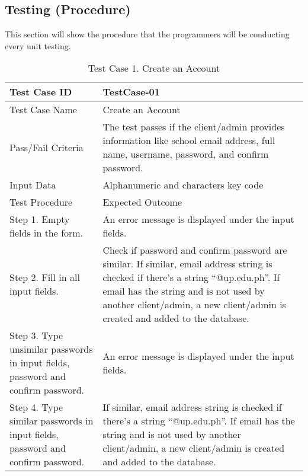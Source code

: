 \newpage
\subsection{Testing (Procedure)}
This section will show the procedure that the programmers will be conducting every unit testing. 

\begin{table}[h!]   %
\centering
\caption{Test Case 1. Create an Account} \vspace{0.25em}
\begin{tabular}{|p{2in}|p{4in}|} \hline
\centering 
Test Case ID & TestCase-01 \\ \hline
Test Case Name       &   Create an Account   \\ \hline
Pass/Fail Criteria       &   The test passes if the client/admin provides information like school email address, full name, username, password, and confirm password.    \\ \hline
Input Data  &  Alphanumeric and characters key code  \\ \hline
Test Procedure   & Expected Outcome  \\ \hline
Step 1. Empty fields in the form.        &    An error message is displayed under the input fields.    \\ \hline
Step 2. Fill in all input fields.   & Check if password and confirm password are similar. If similar, email address string is checked if there’s a string “@up.edu.ph”. If email has the string and is not used by another client/admin, a new client/admin is created and added to the database.   \\ \hline
Step 3. Type unsimilar passwords in input fields, password and confirm password. & An error message is displayed under the input fields. \\ \hline
Step 4. Type similar passwords in input fields, password and confirm password. & If similar, email address string is checked if there’s a string “@up.edu.ph”. If email has the string and is not used by another client/admin, a new client/admin is created and added to the database.  \\ \hline
\end{tabular}
\label{tab:test1}
\end{table}


